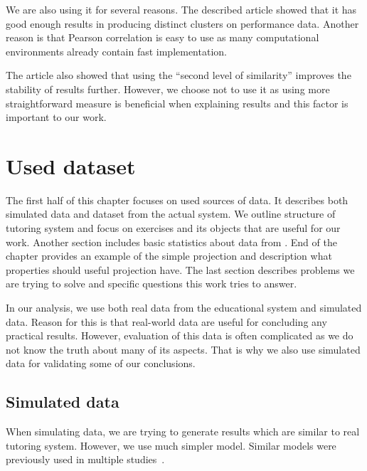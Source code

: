 \documentclass[
  print, %
  table,   %
  nolof,     %
  nolot,     %
  nocover,
  color,
  final,
]{fithesis3}
\begin{document}
We are also using it for several reasons. The described article showed that it has good enough results in producing distinct clusters on performance data. Another reason is that Pearson correlation is easy to use as many computational environments already contain fast implementation.

The article also showed that using the ``second level of similarity'' improves the stability of results further. However, we choose not to use it as using more straightforward measure is beneficial when explaining results and this factor is important to our work.


\chapter{Used dataset}\label{used-dataset}

The first half of this chapter focuses on used sources of data. It describes both simulated data and dataset from the actual system. We outline structure of tutoring system and focus on exercises and its objects that are useful for our work. Another section includes basic statistics about data from \umimeCesky{}. End of the chapter provides an example of the simple projection and description what properties should useful projection have. The last section describes problems we are trying to solve and specific questions this work tries to answer.


In our analysis, we use both real data from the educational system and simulated data. Reason for this is that real-world data are useful for concluding any practical results. However, evaluation of this data is often complicated as we do not know the truth about many of its aspects. That is why we also use simulated data for validating some of our conclusions.


\section{Simulated data}\label{simulated-data}

When simulating data, we are trying to generate results which are similar to real tutoring system. However, we use much simpler model. Similar models were previously used in multiple studies~\cite{piech2015deep, pelanek2017measuring}.
\end{document}
